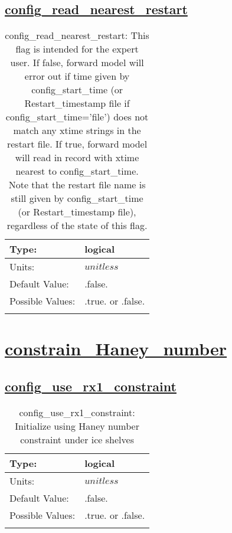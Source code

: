 \subsection[config\_read\_nearest\_restart]{\hyperref[sec:nm_tab_debug]{config\_read\_nearest\_restart}}
\label{subsec:nm_sec_config_read_nearest_restart}
\begin{center}
\begin{longtable}{| p{2.0in} || p{4.0in} |}
    \hline
    Type: & logical \\
    \hline
    Units: & $unitless$ \\
    \hline
    Default Value: & .false. \\
    \hline
    Possible Values: & .true. or .false. \\
    \hline
    \caption{config\_read\_nearest\_restart: This flag is intended for the expert user.  If false, forward model will error out if time given by config\_start\_time (or Restart\_timestamp file if config\_start\_time='file') does not match any xtime strings in the restart file.  If true, forward model will read in record with xtime nearest to config\_start\_time.  Note that the restart file name is still given by config\_start\_time (or Restart\_timestamp file), regardless of the state of this flag.}
\end{longtable}
\end{center}
\section[constrain\_Haney\_number]{\hyperref[sec:nm_tab_constrain_Haney_number]{constrain\_Haney\_number}}
\label{sec:nm_sec_constrain_Haney_number}
\subsection[config\_use\_rx1\_constraint]{\hyperref[sec:nm_tab_constrain_Haney_number]{config\_use\_rx1\_constraint}}
\label{subsec:nm_sec_config_use_rx1_constraint}
\begin{center}
\begin{longtable}{| p{2.0in} || p{4.0in} |}
    \hline
    Type: & logical \\
    \hline
    Units: & $unitless$ \\
    \hline
    Default Value: & .false. \\
    \hline
    Possible Values: & .true. or .false. \\
    \hline
    \caption{config\_use\_rx1\_constraint: Initialize using Haney number constraint under ice shelves}
\end{longtable}
\end{center}
